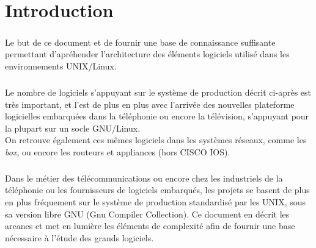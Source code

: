 
\chapter{Introduction}

\paragraph{}
Le but de ce document et de fournir une base de connaissance suffisante permettant d'apréhender l'architecture des
éléments logiciels utilisé dans les environnements UNIX/Linux.

\paragraph{}
Le nombre de logiciels s'appuyant sur le système de production décrit ci-après est très important, et l'est de plus
en plus avec l'arrivée des nouvelles plateforme logicielles embarquées dans la téléphonie ou encore la télévision,
s'appuyant pour la plupart sur un socle GNU/Linux.\\
On retrouve également ces mêmes logiciels dans les systèmes réseaux, comme les {\it box}, ou encore les routeurs et
appliances (hors CISCO IOS).

\paragraph{}
Dans le métier des télécommunications ou encore chez les industriels de la téléphonie ou les fournisseurs de
logiciels embarqués, les projets se basent de plus en plus fréquement sur le système de production standardisé par
les UNIX, sous sa version libre GNU (Gnu Compiler Collection). Ce document en décrit les arcanes et met en lumière
les éléments de complexité afin de fournir une base nécessaire à l'étude des grands logiciels.
